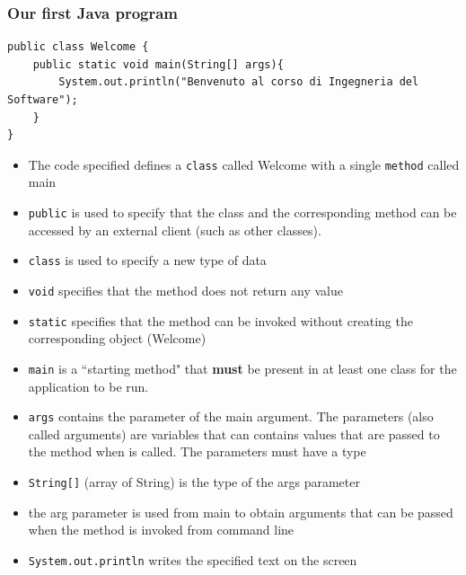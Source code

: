 \documentclass{article}
\theoremstyle{definition}
\begin{document}
\subsubsection{Our first Java program}
\begin{lstlisting}
public class Welcome {	
    public static void main(String[] args){	
	 	System.out.println("Benvenuto al corso di Ingegneria del Software");
    }
}
\end{lstlisting}
\begin{itemize}
\item The code specified defines a \texttt{class} called Welcome with a single \texttt{method} called main
\item \texttt{public} is used to specify that the class and the corresponding method can be accessed by an external client (such as other classes).
\item \texttt{class} is used to specify a new type of data
\item \texttt{void} specifies that the method does not return any value
\item \texttt{static} specifies that the method can be invoked without creating the corresponding object (Welcome)
\item \texttt{main} is a ``starting method" that \textbf{must} be present in at least one class for the application to be run.
\item \texttt{args} contains the parameter of the main argument. The parameters (also called arguments) are variables that can contains values that are passed to the method when is called. The parameters must have a type
\item \texttt{String[]} (array of String) is the type of the args parameter 
\item the arg parameter is used from main to obtain arguments that can be passed when the method is invoked from command line
\item \texttt{System.out.println} writes the specified text on the screen
\end{itemize}
\end{document}
